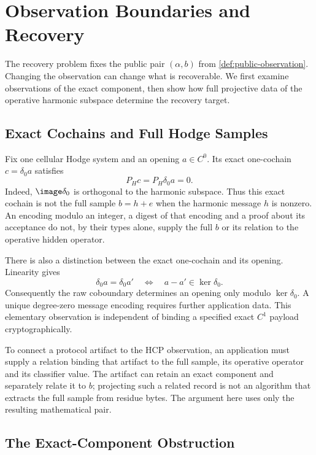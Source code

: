 \section{Observation Boundaries and Recovery}\label{sec:observation-boundaries}\label{sec:projective-observation-boundary}

The recovery problem fixes the public pair \((\alpha,b)\) from
\cref{def:public-observation}. Changing the observation can change what is
recoverable. We first examine observations of the exact component, then
show how full projective data of the operative harmonic subspace determine
the recovery target.

\subsection{Exact Cochains and Full Hodge Samples}

Fix one cellular Hodge system and an opening \(a\in C^0\). Its exact
one-cochain \(c=\delta_0a\) satisfies
\[
  P_Hc=P_H\delta_0a=0.
\]
Indeed, \(\image\delta_0\) is orthogonal to the harmonic subspace.
Thus this exact cochain is not the full sample \(b=h+e\) when the harmonic
message \(h\) is nonzero. An encoding modulo an integer, a digest of that
encoding and a proof about its acceptance do not, by their types alone,
supply the full \(b\) or its relation to the operative hidden operator.

There is also a distinction between the exact one-cochain and its opening.
Linearity gives
\[
  \delta_0a=\delta_0a'
  \quad\Longleftrightarrow\quad
  a-a'\in\ker\delta_0.
\]
Consequently the raw coboundary determines an opening only modulo
\(\ker\delta_0\). A unique degree-zero message encoding requires further
application data. This elementary observation is independent of binding a
specified exact \(C^1\) payload cryptographically.

To connect a protocol artifact to the HCP observation, an application must
supply a relation binding that artifact to the full sample, its operative
operator and its classifier value. The artifact can retain an exact
component and separately relate it to \(b\); projecting such a related record
is not an algorithm that extracts the full sample from residue bytes.
The argument here uses only the resulting mathematical pair.

\subsection{The Exact-Component Obstruction}

